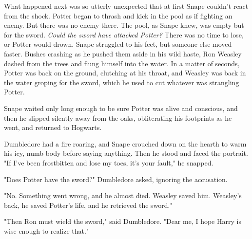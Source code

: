 What happened next was so utterly unexpected that at first Snape couldn't react from the shock. Potter began to thrash and kick in the pool as if fighting an enemy. But there was no enemy there. The pool, as Snape knew, was empty but for the sword. \emph{Could the sword have attacked Potter?} There was no time to lose, or Potter would drown. Snape struggled to his feet, but someone else moved faster. Bushes crashing as he pushed them aside in his wild haste, Ron Weasley dashed from the trees and flung himself into the water. In a matter of seconds, Potter was back on the ground, clutching at his throat, and Weasley was back in the water groping for the sword, which he used to cut whatever was strangling Potter.

Snape waited only long enough to be sure Potter was alive and conscious, and then he slipped silently away from the oaks, obliterating his footprints as he went, and returned to Hogwarts.

Dumbledore had a fire roaring, and Snape crouched down on the hearth to warm his icy, numb body before saying anything. Then he stood and faced the portrait. "If I've been frostbitten and lose my toes, it's your fault," he snapped.

"Does Potter have the sword?" Dumbledore asked, ignoring the accusation.

"No. Something went wrong, and he almost died. Weasley saved him. Weasley's back, he saved Potter's life, and he retrieved the sword."

"Then Ron must wield the sword," said Dumbledore. "Dear me, I hope Harry is wise enough to realize that."


